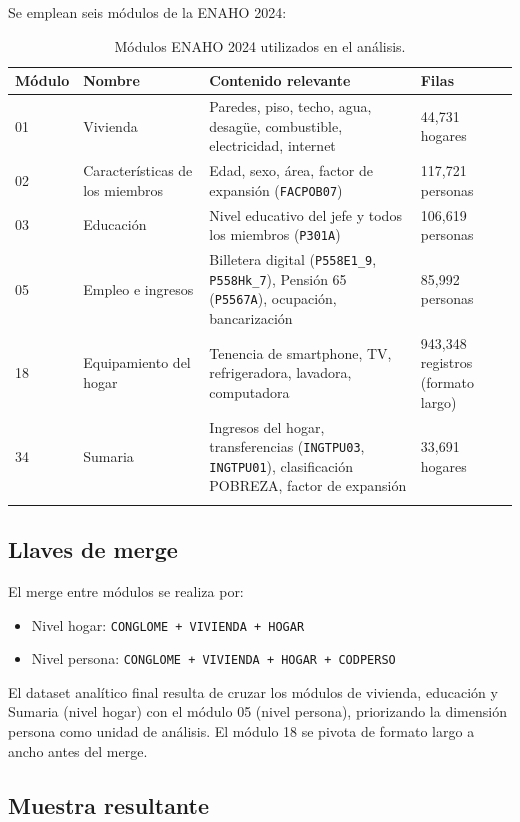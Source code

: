 \documentclass[12pt, a4paper]{article}
\begin{document}
Se emplean seis módulos de la ENAHO 2024:

\begin{longtable}{@{}llp{7cm}l@{}}
\toprule
Módulo & Nombre & Contenido relevante & Filas \\\midrule
\endhead
01 & Vivienda & Paredes, piso, techo, agua, desagüe, combustible, electricidad, internet & 44{,}731 hogares \\
02 & Características de los miembros & Edad, sexo, área, factor de expansión (\texttt{FACPOB07}) & 117{,}721 personas \\
03 & Educación & Nivel educativo del jefe y todos los miembros (\texttt{P301A}) & 106{,}619 personas \\
05 & Empleo e ingresos & Billetera digital (\texttt{P558E1\_9}, \texttt{P558Hk\_7}), Pensión 65 (\texttt{P5567A}), ocupación, bancarización & 85{,}992 personas \\
18 & Equipamiento del hogar & Tenencia de smartphone, TV, refrigeradora, lavadora, computadora & 943{,}348 registros (formato largo) \\
34 & Sumaria & Ingresos del hogar, transferencias (\texttt{INGTPU03}, \texttt{INGTPU01}), clasificación POBREZA, factor de expansión & 33{,}691 hogares \\
\bottomrule
\caption{Módulos ENAHO 2024 utilizados en el análisis.}
\end{longtable}

\subsection{Llaves de merge}

El merge entre módulos se realiza por:
\begin{itemize}[noitemsep]
  \item Nivel hogar: \texttt{CONGLOME + VIVIENDA + HOGAR}
  \item Nivel persona: \texttt{CONGLOME + VIVIENDA + HOGAR + CODPERSO}
\end{itemize}

El dataset analítico final resulta de cruzar los módulos de vivienda, educación
y Sumaria (nivel hogar) con el módulo 05 (nivel persona), priorizando la
dimensión persona como unidad de análisis. El módulo 18 se pivota de formato
largo a ancho antes del merge.

\subsection{Muestra resultante}
\end{document}
